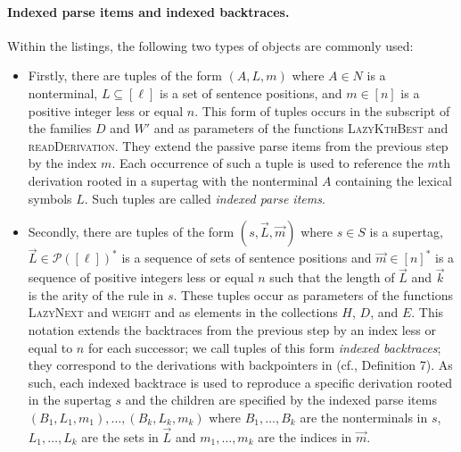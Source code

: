 \documentclass[../../document.tex]{subfiles}
\begin{document}
    \paragraph{Indexed parse items and indexed backtraces.}
    Within the listings, the following two types of objects are commonly used:
    \begin{itemize}
        \item
            Firstly, there are tuples of the form \((A, L, m)\) where \(A \in N\) is a nonterminal, \(L \subseteq [\ell]\) is a set of sentence positions, and \(m \in [n]\) is a positive integer less or equal \(n\).
            This form of tuples occurs in the subscript of the families \(D\) and \(W'\) and as parameters of the functions \textsc{LazyKthBest} and \textsc{readDerivation}.
            They extend the passive parse items from the previous step by the index \(m\).
            Each occurrence of such a tuple is used to reference the \(m\)th derivation rooted in a supertag with the nonterminal \(A\) containing the lexical symbols \(L\).
            Such tuples are called \emph{indexed parse items}.
        \item
            Secondly, there are tuples of the form \((s, \vec{L}, \vec{m})\) where \(s\in S\) is a supertag, \(\vec{L} \in \mathcal{P}([\ell])^*\) is a sequence of sets of sentence positions and \(\vec{m} \in [n]^*\) is a sequence of positive integers less or equal \(n\) such that the length of \(\vec{L}\) and \(\vec{k}\) is the arity of the  rule in \(s\).
            These tuples occur as parameters of the functions \textsc{LazyNext} and \textsc{weight} and as elements in the collections \(H\), $D$, and $E$.
            This notation extends the backtraces from the previous step by an index less or equal to \(n\) for each successor; we call tuples of this form \emph{indexed backtraces}; they correspond to the derivations with backpointers in  (cf.\@ \citealp{HuaChia05}, Definition 7).
            As such, each indexed backtrace is used to reproduce a specific derivation rooted in the supertag \(s\) and the children are specified by the indexed parse items \((B_1, L_1, m_1), \ldots, (B_k, L_k, m_k)\) where \(B_1, \ldots, B_k\) are the  nonterminals in \(s\), \(L_1, \ldots, L_k\) are the sets in \(\vec{L}\) and \(m_1, \ldots, m_k\) are the indices in \(\vec{m}\).
    \end{itemize}
\end{document}
